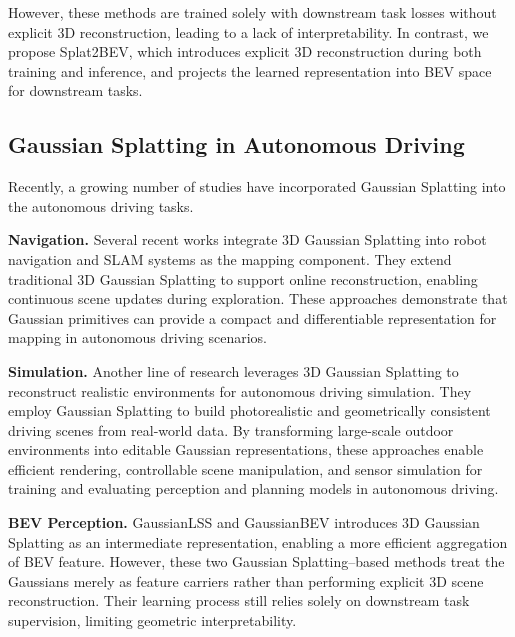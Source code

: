 However, these methods are trained solely with downstream task losses without explicit 3D reconstruction, leading to a lack of interpretability.
In contrast, we propose Splat2BEV, which introduces explicit 3D reconstruction during both training and inference, and projects the learned representation into BEV space for downstream tasks.

\subsection{Gaussian Splatting in Autonomous Driving}
Recently, a growing number of studies have incorporated Gaussian Splatting into the autonomous driving tasks.

\noindent\textbf{Navigation.}
Several recent works \cite{keetha2024splatam, matsuki2024gaussian, yan2024gs, huang2024photo, peng2024rtg} integrate 3D Gaussian Splatting into robot navigation and SLAM systems as the mapping component.
They extend traditional 3D Gaussian Splatting to support online reconstruction, enabling continuous scene updates during exploration.
These approaches demonstrate that Gaussian primitives can provide a compact and differentiable representation for mapping in autonomous driving scenarios.

\noindent\textbf{Simulation.}
Another line of research \cite{yan2024street, zhou2024drivinggaussian, zhou2024hugs, hess2025splatad} leverages 3D Gaussian Splatting to reconstruct realistic environments for autonomous driving simulation.
They employ Gaussian Splatting to build photorealistic and geometrically consistent driving scenes from real-world data.
By transforming large-scale outdoor environments into editable Gaussian representations, these approaches enable efficient rendering, controllable scene manipulation, and sensor simulation for training and evaluating perception and planning models in autonomous driving.

\noindent\textbf{BEV Perception.}
GaussianLSS \cite{lu2025toward} and GaussianBEV \cite{chabot2025gaussianbev} introduces 3D Gaussian Splatting as an intermediate representation, enabling a more efficient aggregation of BEV feature.
However, these two Gaussian Splatting–based methods treat the Gaussians merely as feature carriers rather than performing explicit 3D scene reconstruction.
Their learning process still relies solely on downstream task supervision, limiting geometric interpretability.

